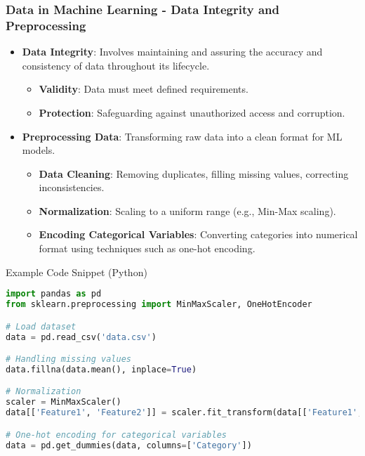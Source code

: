 \documentclass{beamer}
\begin{document}
\begin{frame}[fragile]
    \frametitle{Data in Machine Learning - Data Integrity and Preprocessing}
    \begin{itemize}
        \item \textbf{Data Integrity}: Involves maintaining and assuring the accuracy and consistency of data throughout its lifecycle.
        \begin{itemize}
            \item \textbf{Validity}: Data must meet defined requirements.
            \item \textbf{Protection}: Safeguarding against unauthorized access and corruption.
        \end{itemize}
        \item \textbf{Preprocessing Data}: Transforming raw data into a clean format for ML models.
        \begin{itemize}
            \item \textbf{Data Cleaning}: Removing duplicates, filling missing values, correcting inconsistencies.
            \item \textbf{Normalization}: Scaling to a uniform range (e.g., Min-Max scaling).
            \item \textbf{Encoding Categorical Variables}: Converting categories into numerical format using techniques such as one-hot encoding.
        \end{itemize}
    \end{itemize}
    \begin{block}{Example Code Snippet (Python)}
    \begin{lstlisting}[language=Python]
import pandas as pd
from sklearn.preprocessing import MinMaxScaler, OneHotEncoder

# Load dataset
data = pd.read_csv('data.csv')

# Handling missing values
data.fillna(data.mean(), inplace=True)

# Normalization
scaler = MinMaxScaler()
data[['Feature1', 'Feature2']] = scaler.fit_transform(data[['Feature1', 'Feature2']])

# One-hot encoding for categorical variables
data = pd.get_dummies(data, columns=['Category'])
    \end{lstlisting}
    \end{block}
\end{frame}
\end{document}
